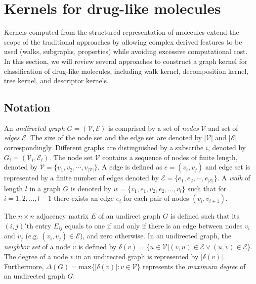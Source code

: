 \documentclass[english]{tktltiki}
\newcommand{\Ecal}{\mathcal{E}}
\newcommand{\Vcal}{\mathcal{V}}
\begin{document}
\clearpage
\section{Kernels for drug-like molecules}
\label{kernel_methods_sc}

Kernels computed from the structured representation of molecules extend the scope of the traditional approaches by allowing complex derived features to be used (walks, subgraphs, properties) while avoiding excessive computational cost. In this section, we will review several approaches to construct a graph kernel for classification of drug-like molecules, including walk kernel, decomposition kernel, tree kernel, and descriptor kernels. 


\subsection{Notation}

An {\em undirected graph} $G = (\Vcal, \Ecal)$ is comprised by a set of {\em nodes} $\Vcal$ and set of {\em edges} $\Ecal$. The size of the node set and the edge set are denoted by $|\Vcal|$ and $|\Ecal|$ correspondingly. Different graphs are distinguished by a subscribe $i$, denoted by $G_i = (\Vcal_i, \Ecal_i)$. The node set $\Vcal$ contains a sequence of nodes of finite length, denoted by $\Vcal = \{v_1,v_2,\cdots,v_{|\Vcal|}\}$. A edge is defined as $e = (v_i,v_j)$ and edge set is represented by a finite number of edges denoted by $\Ecal = \{e_1,e_2,\cdots,e_{|\Ecal|}\}$. A {\em walk} of length \(l\) in a graph \(G\) is denoted by \(w = \{v_1,e_1,v_2,e_2,...,v_l\}\) such that for \(i = 1,2,...,{l-1}\) there exists an edge $e_i$ for each pair of nodes \((v_i,v_{i+1})\). 


The \(n \times n\) adjacency matrix \(E\) of an undirect graph $G$ is defined such that its $(i, j)'\text{th}$ entry $E_{ij}$ equals to one if and only if there is an edge between nodes $v_i$ and $v_j$ (e.g. $(v_i,v_j) \in \Ecal$), and zero otherwise. In an undirected graph, the {\em neighbor set} of a node $v$ is defined by $\delta(v) = \{u \in \Vcal| (v,u) \in \Ecal \vee (u,v) \in \Ecal\}$. The degree of a node $v$ in an undirected graph is represented by $|\delta(v)|$. Furthermore, $\Delta(G)=\text{max}\{|\delta(v)|:v \in \Vcal\}$ represents the {\em maximum degree} of an undirected graph $G$. 
\end{document}
